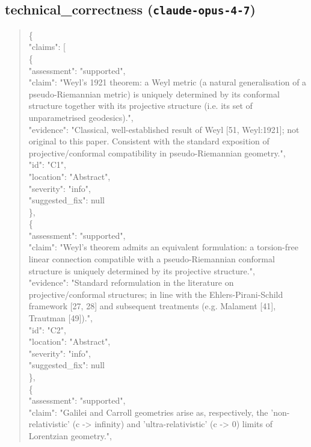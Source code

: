 \documentclass[11pt]{article}
\begin{document}
\subsection*{technical_correctness (\texttt{claude-opus-4-7})}
\begin{quote}\small\ttfamily\raggedright
\{\\
  "claims": [\\
    \{\\
      "assessment": "supported",\\
      "claim": "Weyl's 1921 theorem: a Weyl metric (a natural generalisation of a pseudo-Riemannian metric) is uniquely determined by its conformal structure together with its projective structure (i.e. its set of unparametrised geodesics).",\\
      "evidence": "Classical, well-established result of Weyl [51, Weyl:1921]; not original to this paper. Consistent with the standard exposition of projective/conformal compatibility in pseudo-Riemannian geometry.",\\
      "id": "C1",\\
      "location": "Abstract",\\
      "severity": "info",\\
      "suggested\_fix": null\\
    \},\\
    \{\\
      "assessment": "supported",\\
      "claim": "Weyl's theorem admits an equivalent formulation: a torsion-free linear connection compatible with a pseudo-Riemannian conformal structure is uniquely determined by its projective structure.",\\
      "evidence": "Standard reformulation in the literature on projective/conformal structures; in line with the Ehlers-Pirani-Schild framework [27, 28] and subsequent treatments (e.g. Malament [41], Trautman [49]).",\\
      "id": "C2",\\
      "location": "Abstract",\\
      "severity": "info",\\
      "suggested\_fix": null\\
    \},\\
    \{\\
      "assessment": "supported",\\
      "claim": "Galilei and Carroll geometries arise as, respectively, the 'non-relativistic' (c -> infinity) and 'ultra-relativistic' (c -> 0) limits of Lorentzian geometry.",\\

\end{quote}
\end{document}
